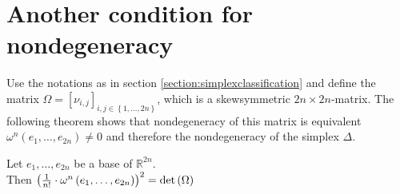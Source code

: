 \documentclass[../SymplecticSimplices.tex]{subfiles}
\begin{document}
\section{Another condition for nondegeneracy}
Use the notations as in section \ref{section:simplexclassification} and define the matrix \( \Omega = \left[ \nu_{i,j} \right]_{i, j \in \left\lbrace 1, \dots, 2n \right\rbrace} \), which is a skewsymmetric \( 2n \times 2n \)-matrix. The following theorem shows that nondegeneracy of this matrix is equivalent \( \omega^n \left( e_1, \dots, e_{2n} \right) \neq 0 \) and therefore the nondegeneracy of the simplex \( \Delta \).

\begin{theorem}
  Let \( e_1, \dots, e_{2n} \) be a base of \( \mathbb{R}^{2n} \).\\
  Then \( \left( \frac{1}{n!} \cdot \omega^n \left( e_1, \dots, e_{2n} \right) \right)^2 = \textnormal{det}\left( \Omega \right) \)
\end{theorem}
\end{document}
